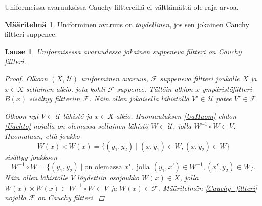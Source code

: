 \documentclass[12pt,a4paper,leqno]{report}
\newcommand{\U}{\,\mathcal{U}}
\newcommand{\F}{\mathcal{F}}
\theoremstyle{plain}
\newtheorem{lause}[equation]{Lause}
\theoremstyle{definition}
\newtheorem{maar}[equation]{Määritelmä}
\theoremstyle{remark}
\begin{document}
\noindent Uniformeissa avaruuksissa Cauchy filttereillä ei välttämättä ole raja-arvoa.

\begin{maar}
Uniforminen avaruus on \emph{täydellinen}, 
jos sen jokainen Cauchy filtteri suppenee.
\end{maar}
\begin{lause}
Uniformisessa avaruudessa jokainen suppeneva filtteri on Cauchy filtteri.
\begin{proof}
Olkoon $(X,\U)$ uniforminen avaruus, $\F$ suppeneva filtteri joukolle $X$ ja $x\in X$ 
sellainen alkio, jota kohti $\F$ suppenee. 
Tällöin alkion $x$ ympäristöfiltteri $B(x)$ sisältyy filtteriin $\F$. 
Näin ollen jokaisella lähistöllä $V'\in\U$ pätee $V'\in\F$. 

Olkoon nyt $V\in\U$ lähistö ja $x\in X$ alkio. Huomautuksen \ref{UaHuom} ehdon \ref{Uaehto} nojalla on olemassa 
sellainen lähistö $W\in\U$, jolla $W^{-1}\circ W\subset V$. 
Huomataan, että joukko 
$$W(x)\times W(x)=\{ (y_1,y_2)\mid (x,y_1)\in W,(x,y_2)\in W\} $$
sisältyy joukkoon 
$$W^{-1}\circ W=\{ (y_1,y_2)\mid \text{on olemassa }x',\text{ jolla }(y_1,x')\in W^{-1},(x',y_2)\in W\}.$$ 
Näin ollen lähistölle $V$ löydettiin osajoukko $W(x)\in X$, 
jolla $W(x)\times W(x)\subset W^{-1}\circ W\subset V$ ja $W(x)\in\F$. 
Määritelmän \ref{Cauchy_filtteri} nojalla $\F$ on Cauchy filtteri.
\end{proof}
\end{lause}
\end{document}
